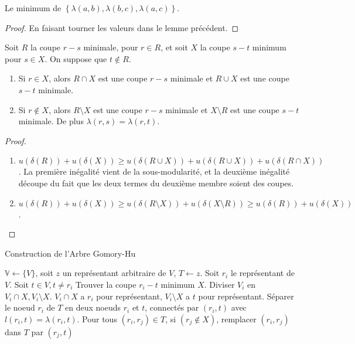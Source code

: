 \documentclass[math, info]{cours}
\begin{document}
\begin{corollaire}
	Le minimum de $\left\{\lambda(a, b), \lambda(b, c), \lambda(a, c)\right\}$.
\end{corollaire}
\begin{proof}
	En faisant tourner les valeurs dans le lemme précédent.
\end{proof}

\begin{lemme}
	Soit $R$ la coupe $r-s$ minimale, pour $r \in R$, et soit $X$ la coupe $s-t$ minimum pour $s \in X$. On suppose que $t \notin R$.
	\begin{enumerate}
		\item Si $r \in X$, alors $R \cap X$ est une coupe $r-s$ minimale et $R \cup X$ est une coupe $s-t$ minimale.
		\item Si $r \notin X$, alors $R\setminus X$ est une coupe $r-s$ minimale et $X \setminus R$ est une coupe $s-t$ minimale. De plus $\lambda(r, s) = \lambda(r, t)$.
	\end{enumerate}
	\label{lemmastar}
\end{lemme}
\begin{proof}
	\begin{enumerate}
		\item $u(\delta(R)) + u(\delta(X)) \geq u(\delta(R \cup X)) + u(\delta(R \cup X)) + u\left(\delta(R\cap X)\right)$.
		      La première inégalité vient de la sous-modularité, et la deuxième inégalité découpe du fait que les deux termes du deuxième membre soient des coupes.
		\item $u(\delta(R)) + u(\delta(X)) \geq u(\delta(R \setminus X)) + u(\delta(X\setminus R)) \geq u(\delta(R)) + u(\delta(X))$.
	\end{enumerate}
\end{proof}

\begin{algorithm}
	\caption{Construction de l'Arbre Gomory-Hu}
	\begin{algorithmic}
		\State $\mathbb{V} \gets \{V\}$, soit $z$ un représentant arbitraire de $V$, $T \gets z$.
		\State Soit $r_{i}$ le représentant de $V$.
		\State Soit $t \in V, t \neq r_{i}$
		\State Trouver la coupe $r_{i} - t$ minimum $X$.
		\State Diviser $V_{i}$ en $V_{i} \cap X, V_{i} \setminus X$.
		\State $V_{i}\cap X$ a $r_{i}$ pour représentant, $V_{i} \setminus X$ a $t$ pour représentant.
		\State Séparer le noeud $r_{i}$ de $T$ en deux noeuds $r_{i}$ et $t$, connectés par $(r_{i}, t)$ avec $l(r_{i}, t) = \lambda(r_{i}, t)$.
		\State Pour tous $(r_{i}, r_{j}) \in T$, si $(r_{j} \notin X)$, remplacer $(r_{i}, r_{j})$ dans $T$ par $(r_{j}, t)$
		\EndWhile
	\end{algorithmic}
\end{algorithm}
\end{document}
